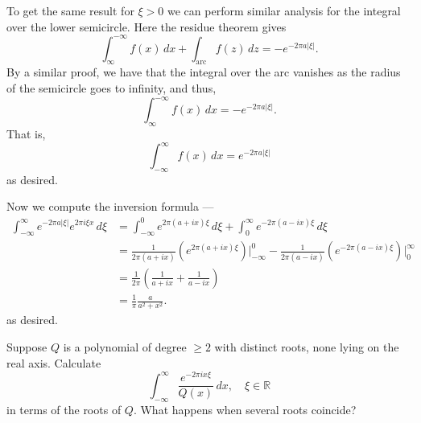 \documentclass[12 pt, letterpaper]{hmcpset}
\begin{document}
\begin{solution}
	To get the same result for $\xi > 0$ we can perform similar analysis for the integral over the lower semicircle. Here the residue theorem gives
	\[
		\int_{\infty}^{- \infty} f(x) \, dx + \int_{\text{arc}} f(z) \, dz = - e^{-2 \pi a \lvert \xi \rvert}.
	\]
	By a similar proof, we have that the integral over the arc vanishes as the radius of the semicircle goes to infinity, and thus,
	 \[
		\int_{\infty}^{-\infty} f(x) \, dx = - e^{-2 \pi a \lvert \xi \rvert}.
	\]
	That is,
	\[
		\int_{- \infty}^{\infty} f(x) \, dx = e^{-2 \pi a \lvert \xi \rvert}
	\]
	as desired.

	Now we compute the inversion formula ---
	\[
		\begin{split}
			\int_{-\infty}^{\infty} e^{-2 \pi a \lvert \xi \rvert} e^{2 \pi i \xi x} \, d \xi & = \int_{-\infty}^{0} e^{2 \pi (a + i x) \xi} \, d \xi + \int_{0}^{\infty} e^{- 2 \pi (a - i x) \xi} \, d \xi \\
													  & = \frac{1}{2 \pi (a + i x)} (e^{2 \pi (a + i x) \xi}) \Big |_{-\infty}^{0} - \frac{1}{2 \pi (a - i x)} (e^{- 2 \pi (a - i x) \xi}) \Big |_{0}^{\infty} \\
													  & = \frac{1}{2 \pi} \left ( \frac{1}{a + i x} + \frac{1}{a - i x} \right ) \\
													  & = \frac{1}{\pi} \frac{a}{a^{2} + x^{2}}.
		\end{split}
	\]
	as desired.
\end{solution}

\pagebreak

\begin{problem}[4.]
	Suppose $Q$ is a polynomial of degree $\ge 2$ with distinct roots, none lying on the real axis. Calculate
	\[
		\int_{-\infty}^{\infty} \frac{e^{-2 \pi i x \xi}}{Q(x)} \, dx, \quad \xi \in \mathbb{R}
	\]
	in terms of the roots of $Q$. What happens when several roots coincide?
\end{problem}
\end{document}
